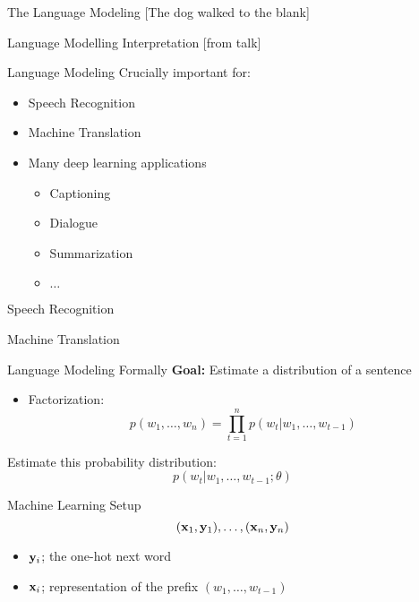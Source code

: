 \documentclass{beamer}
\begin{document}
\begin{frame}{The Language Modeling }
  [The dog walked to the \alert{blank}]
\end{frame}

\begin{frame}{Language Modelling Interpretation}
  [from talk]
\end{frame}

\begin{frame}{Language Modeling}
  Crucially important for:

  \begin{itemize}
  \item Speech Recognition
  \item Machine Translation
  \item Many deep learning applications
    \begin{itemize}
    \item Captioning
    \item Dialogue
    \item Summarization
    \item $\dots$
    \end{itemize}
  \end{itemize}
\end{frame}

\begin{frame}{Speech Recognition }

\end{frame}

\begin{frame}{Machine Translation}

\end{frame}

\begin{frame}{Language Modeling Formally}
  \textbf{Goal:} Estimate a distribution of a sentence

  \begin{itemize}
  \item Factorization:
    \[ p(w_1, \ldots, w_n) = \prod_{t=1}^n p(w_t | w_1, \ldots, w_{t-1}) \]
  \end{itemize}

  Estimate this probability distribution:
  \[ p(w_t | w_1, \ldots, w_{t-1};\theta)\]
\end{frame}

\begin{frame}{Machine Learning Setup}
  \[ (\mathbf{x}_1, \mathbf{y}_1), \ldots, (\mathbf{x}_n, \mathbf{y}_n) \]
  \begin{itemize}
  \item $\mathbf{y}_i$; the one-hot next word
  \item $\mathbf{x}_i$; representation of the prefix $(w_1, \ldots, w_{t-1})$
  \end{itemize}
\end{frame}
\end{document}
